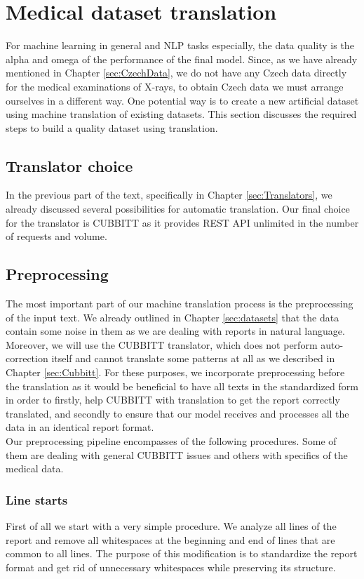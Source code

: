 \section{Medical dataset translation}
\label{sec:medDataTranslation}
For machine learning in general and NLP tasks especially, the data quality is the alpha and omega of the performance of the final model. Since, as we have already mentioned in Chapter \ref{sec:CzechData}, we do not have any Czech data directly for the medical examinations of X-rays, to obtain Czech data we must arrange ourselves in a different way. One potential way is to create a new artificial dataset using machine translation of existing datasets. This section discusses the required steps to build a quality dataset using translation.

\subsection{Translator choice}
In the previous part of the text, specifically in Chapter \ref{sec:Translators}, we already discussed several possibilities for automatic translation. Our final choice for the translator is CUBBITT as it provides REST API unlimited in the number of requests and volume.

\subsection{Preprocessing}
\label{sec:DataPreprocessing}
The most important part of our machine translation process is the preprocessing of the input text. We already outlined in Chapter \ref{sec:datasets} that the data contain some noise in them as we are dealing with reports in natural language. Moreover, we will use the CUBBITT translator, which does not perform auto-correction itself and cannot translate some patterns at all as we described in Chapter \ref{sec:Cubbitt}. For these purposes, we incorporate preprocessing before the translation as it would be beneficial to have all texts in the standardized form in order to firstly, help CUBBITT with translation to get the report correctly translated, and secondly to ensure that our model receives and processes all the data in an identical report format.\\

Our preprocessing pipeline encompasses of the following procedures. Some of them are dealing with general CUBBITT issues and others with specifics of the medical data.

\subsubsection*{Line starts}
First of all we start with a very simple procedure. We analyze all lines of the report and remove all whitespaces at the beginning and end of lines that are common to all lines. The purpose of this modification is to standardize the report format and get rid of unnecessary whitespaces while preserving its structure.

